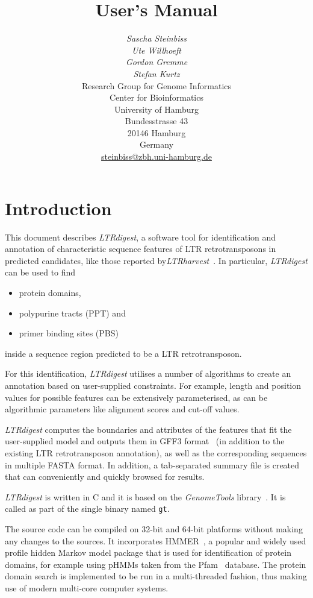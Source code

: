 \documentclass[12pt,titlepage]{article}
\title{\LTRdigest User's Manual}
\author{\begin{tabular}{c}
         \textit{Sascha Steinbiss}\\
         \textit{Ute Willhoeft}\\
         \textit{Gordon Gremme}\\
         \textit{Stefan Kurtz}\\[1cm]
         Research Group for Genome Informatics\\
         Center for Bioinformatics\\
         University of Hamburg\\
         Bundesstrasse 43\\
         20146 Hamburg\\
         Germany\\[1cm]
         \url{steinbiss@zbh.uni-hamburg.de}\\[1cm]
        \end{tabular}}
\newcommand{\LTRdigest}{\textit{LTRdigest}\xspace}
\newcommand{\GenomeTools}{\textit{GenomeTools}\xspace}
\newcommand{\Gt}{\texttt{gt}\xspace}
\begin{document}
\maketitle

\section{Introduction}
\label{Introduction}

This document describes \LTRdigest , a software tool for identification and annotation of characteristic sequence features of LTR retrotransposons in predicted candidates, like those reported by\emph{LTRharvest}~\cite{EKW07}. In particular, \LTRdigest can be used to find
\begin{itemize}
  \item protein domains,
  \item polypurine tracts (PPT) and
  \item primer binding sites (PBS)
\end{itemize}
inside a sequence region predicted to be a LTR retrotransposon.

For this identification, \LTRdigest utilises a number of algorithms to create an annotation based on user-supplied constraints. For example, length and position values for possible features can be extensively parameterised, as can be algorithmic parameters like alignment scores and cut-off values.

\LTRdigest computes the boundaries and attributes of the features that fit the user-supplied model and outputs them in GFF3 format~\cite{gff3} (in addition to the existing LTR retrotransposon annotation), as well as the corresponding sequences in multiple FASTA format. In addition, a tab-separated summary file is created that can conveniently and quickly browsed for results.

\LTRdigest is written in C and it is based on the \GenomeTools library~\cite{genometools}. It is called as part of the single binary named \Gt.

The source code can be compiled on 32-bit and 64-bit platforms without making any changes to the sources. It incorporates HMMER~\cite{hmmer}, a popular and widely used profile hidden Markov model package that is used for identification of protein domains, for example using pHMMs taken from the Pfam~\cite{pfam} database. The protein domain search is implemented to be run in a multi-threaded fashion, thus making use of modern multi-core computer systems.
\end{document}
